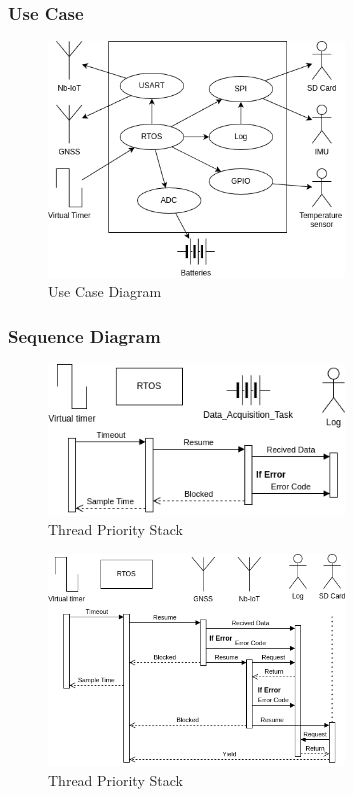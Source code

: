 \subsubsection{Use Case}

\begin{figure}[H]
    \centering
    \includegraphics[width=0.7\textwidth]{images/diagrams/use_case/Use Case.drawio.png}  %
    \caption{Use Case Diagram}
    \label{fig:Use Case Diagram}        
\end{figure}

\subsubsection{Sequence Diagram}

\begin{figure}[H]
    \centering
    \includegraphics[width=0.7\textwidth]{images/diagrams/sequence_diagram/sequence_diagram_1/Sequence Diagram.drawio.png}  %
    \caption{Thread Priority Stack}
    \label{fig:Thread Priority Stack}        
\end{figure}

\begin{figure}[H]
    \centering
    \includegraphics[width=0.7\textwidth]{images/diagrams/sequence_diagram/sequence_diagram_2/Sequence Diagram.drawio.png}  %
    \caption{Thread Priority Stack}
    \label{fig:Thread Priority Stack}        
\end{figure}


